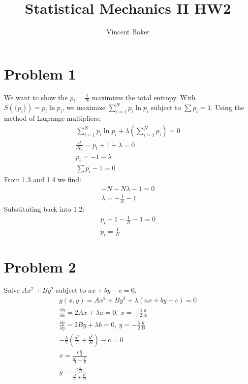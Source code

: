 \documentclass[a4paper,12pt]{article}
\title{Statistical Mechanics II HW2}
\author{Vincent Baker}
\numberwithin{equation}{section}
\begin{document}
\maketitle

\section{Problem 1}
We want to show the $p_i=\frac{1}{N}$ maximizes the total entropy. 
With $S(\{p_i\})=p_i\ln{p_i}$, we maximize $\sum_{i=1}^Np_i\ln{p_i}$ subject to $\sum p_i = 1$.
Using the method of Lagrange multipliers:
\begin{gather}
 \sum_{i=1}^Np_i\ln{p_i}+\lambda \left(\sum_{i=1}^Np_i \right)=0\\
 \frac{d}{dp_i}=p_i+1+\lambda=0\\
 p_i=-1-\lambda\\
 \sum p_i - 1=0
\end{gather}
From 1.3 and 1.4 we find:
\begin{gather}
 -N-N\lambda-1=0\\
 \lambda=-\frac{1}{N}-1
\end{gather}
Substituting back into 1.2:
\begin{gather}
 p_i+1-\frac{1}{N}-1=0\\
 p_i=\frac{1}{N}
\end{gather}

\section{Problem 2}
Solve $Ax^2+By^2$ subject to $ax+by-c=0$.
\begin{gather}
 g(x,y)=Ax^2+By^2+\lambda(ax+by-c)=0\\
 \frac{\partial g}{\partial x}=2Ax+\lambda a=0,\ x=-\frac{\lambda}{2}\frac{a}{A}\\
 \frac{\partial g}{\partial y}=2By+\lambda b = 0,\ y=-\frac{\lambda}{2}\frac{b}{B}\\
 -\frac{\lambda}{2}\left(\frac{a^2}{A}+\frac{b^2}{B}  \right)-c=0\\
 x=\frac{c  \frac{a}{A}}{\frac{a^2}{A}+\frac{b^2}{B}}\\
 y=\frac{c  \frac{b}{B}}{\frac{a^2}{A}+\frac{b^2}{B}}
\end{gather}
\end{document}
